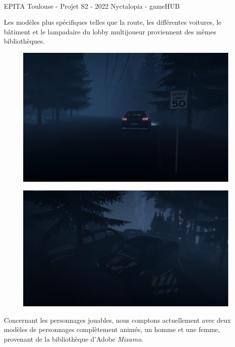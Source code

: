 \vfill
\noindent\makebox[\linewidth]{\rule{.8\paperwidth}{.6pt}}\\[0.2cm]
EPITA Toulouse - Projet S2 - 2022 \hfill Nyctalopia - gameHUB
\noindent\makebox[\linewidth]{\rule{.8\paperwidth}{.6pt}}

\newpage



Les modèles plus spécifiques telles que la route, les différentes voitures, le bâtiment et le lampadaire du lobby multijoueur proviennent des mêmes bibliothèques.
\newline

\begin{figure}[H]
\centering
\begin{minipage}{.5\textwidth}
  \centering
  \includegraphics[width=.6\linewidth]{img/assets/car.png}
  \label{fig:car}
\end{minipage}%
\begin{minipage}{.5\textwidth}
  \centering
  \includegraphics[width=.6\linewidth]{img/assets/crash.png}
  \label{fig:crash}
\end{minipage}
\end{figure}

Concernant les personnages jouables, nous comptons actuellement avec deux modèles de personnages complètement animés, un homme et une femme, provenant de la bibliothèque d’Adobe \emph{Mixamo}.
\newline

